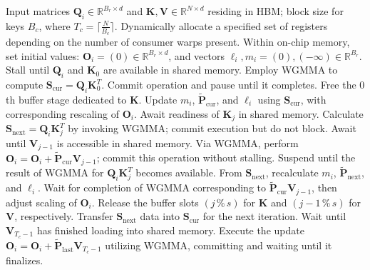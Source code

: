 \begin{algorithm}[H]
    \caption{\small\label{alg:flash3_wgmma}\textsc{FlashAttention-3} Consumer Warpgroup Forward Computation}
    \begin{algorithmic}[1]
      \REQUIRE  Input matrices $\mathbf{Q}_i \in \mathbb{R}^{B_r \times d}$ and $\mathbf{K}, \mathbf{V} \in \mathbb{R}^{N \times d}$ residing in HBM; block size for keys $B_c$, where $T_c = \lceil \frac{N}{B_c} \rceil$.
      \STATE Dynamically allocate a specified set of registers depending on the number of consumer warps present.
      \STATE Within on-chip memory, set initial values: $\mathbf{O}_i = (0) \in \mathbb{R}^{B_r \times d}$, and vectors $\ell_i, m_i = (0), (-\infty) \in \mathbb{R}^{B_r}$.
      \STATE Stall until $\mathbf{Q}_i$ and $\mathbf{K}_0$ are available in shared memory.
      \STATE Employ WGMMA to compute $\mathbf{S}_{\mathrm{cur}} = \mathbf{Q}_i \mathbf{K}_0^T$. Commit operation and pause until it completes.
      \STATE Free the $0$th buffer stage dedicated to $\mathbf{K}$.
      \STATE Update $m_{i}$, $\tilde{\mathbf{P}}_{\mathrm{cur}}$, and $\ell_{i}$ using $\mathbf{S}_{\mathrm{cur}}$, with corresponding rescaling of $\mathbf{O}_i$.
        \STATE Await readiness of $\mathbf{K}_j$ in shared memory.
        \label{code:mainloop_start}
        \STATE Calculate $\mathbf{S}_{\mathrm{next}} = \mathbf{Q}_i \mathbf{K}_{j}^T$ by invoking WGMMA; commit execution but do not block. \label{code:first_wgmma}
        \STATE Await until $\mathbf{V}_{j-1}$ is accessible in shared memory.
        \STATE Via WGMMA, perform $\mathbf{O}_{i} = \mathbf{O}_{i} + \tilde{\mathbf{P}}_{\mathrm{cur}} \mathbf{V}_{j-1}$; commit this operation without stalling. \label{code:second_wgmma}
        \STATE Suspend until the result of WGMMA for $\mathbf{Q}_i \mathbf{K}_{j}^T$ becomes available.
        \STATE From $\mathbf{S}_{\mathrm{next}}$, recalculate $m_{i}$, $\tilde{\mathbf{P}}_{\mathrm{next}}$, and $\ell_{i}$. \label{code:softmax}
        \STATE Wait for completion of WGMMA corresponding to $\tilde{\mathbf{P}}_{\mathrm{cur}} \mathbf{V}_{j-1}$, then adjust scaling of $\mathbf{O}_i$.
        \STATE Release the buffer slots $(j\,\%\,s)$ for $\mathbf{K}$ and $(j-1\,\%\,s)$ for $\mathbf{V}$, respectively.
        \STATE Transfer $\mathbf{S}_{\mathrm{next}}$ data into $\mathbf{S}_{\mathrm{cur}}$ for the next iteration.
        \label{code:mainloop_end}
      \ENDFOR \STATE Wait until $\mathbf{V}_{T_c - 1}$ has finished loading into shared memory.
      \STATE Execute the update $\mathbf{O}_{i} = \mathbf{O}_{i} + \tilde{\mathbf{P}}_{\mathrm{last}} \mathbf{V}_{T_c - 1}$ utilizing WGMMA, committing and waiting until it finalizes.


\end{algorithmic}
\end{algorithm}
